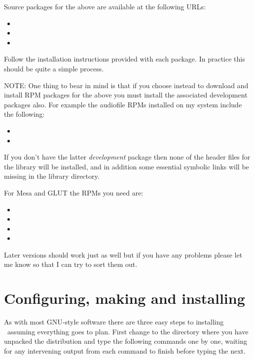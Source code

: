 Source packages for the above are available at the following URLs:

\begin{itemize}
\item{}
\item{}
\item{} 
\end{itemize}

Follow the installation instructions provided with each package. In practice
this should be quite a simple process.

NOTE: One thing to bear in mind is that if you choose instead to
download and install RPM packages for the above you must install
the associated development packages also. For example the audiofile RPMs
installed on my system include the following:

\begin{itemize}
\item{}
\item{}
\end{itemize}

If you don't have the latter \emph{development} package then none of the
header files for the library will be installed, and in addition some
essential symbolic links will be missing in the library directory.

For Mesa and GLUT the RPMs you need are:

\begin{itemize}
\item{}
\item{}
\item{}
\item{}
\end{itemize}

Later versions should work just as well but if you have any problems
please let me know so that I can try to sort them out.

\section{Configuring, making and installing \tao}
As with most GNU-style software there are three easy steps to installing
\tao\ assuming everything goes to plan. First change to the directory
where you have unpacked the distribution and type the following
commands one by one, waiting for any intervening output from each
command to finish before typing the next.

